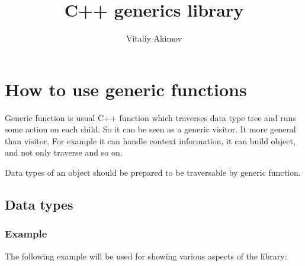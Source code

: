 \documentclass[a4paper]{article}
\begin{document}

\author{Vitaliy Akimov}

\title{C++ generics library}

\newcommand{\gfun}[1]{\subsection{#1}}
\newcommand{\gfunname}[1]{\gfun{#1 function}}

\maketitle
\newpage

\tableofcontents
\newpage



\section{How to use generic functions}


Generic function is usual C++ function which traverses data type tree and runs some action on each child. 
So it can be seen as a generic visitor. It more general than visitor. For example it can handle context
information, it can build object, and not only traverse and so on.

Data types of an object should be prepared to be traversable by generic function.

\subsection{Data types}

\subsubsection{Example}

The following example will be used for showing various aspects of the library:
\end{document}
